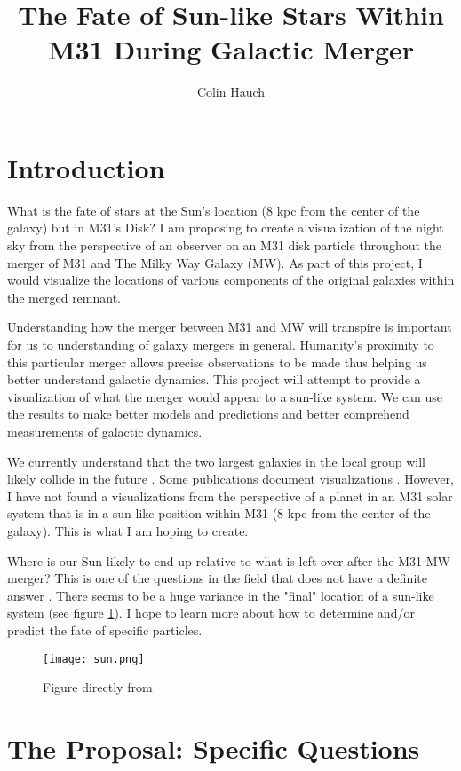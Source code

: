 \documentclass[twocolumn]{aastex63}
\begin{document}
\title{The Fate of Sun-like Stars Within M31 During Galactic Merger}
\author{Colin Hauch}


\section{Introduction} \label{sec:intro}
What is the fate of stars at the Sun's location (8 kpc from the center of the galaxy) but in M31's Disk? I am proposing to create a visualization of the night sky from the perspective of an observer on an M31 disk particle throughout the merger of M31 and The Milky Way Galaxy (MW). As part of this project, I would visualize the locations of various components of the original galaxies within the merged remnant.

Understanding how the merger between M31 and MW will transpire is important for us to understanding of galaxy mergers in general. Humanity's proximity to this particular merger allows precise observations to be made thus helping us better understand galactic dynamics. This project will attempt to provide a visualization of what the merger would appear to a sun-like system. We can use the results to make better models and predictions and better comprehend measurements of galactic dynamics. 

We currently understand that the two largest galaxies in the local group will likely collide in the future \citep[e.g.][and many others]{vdm12,vdm19}. Some publications document visualizations \citep{cox08}. However, I have not found a visualizations from the perspective of a planet in an M31 solar system that is in a sun-like position within M31 (8 kpc from the center of the galaxy). This is what I am hoping to create.

Where is our Sun likely to end up relative to what is left over after the M31-MW merger? This is one of the questions in the field that does not have a definite answer \citep{cox08}. There seems to be a huge variance in the "final" location of a sun-like system (see figure \ref{fig:sun}). I hope to learn more about how to determine and/or predict the fate of specific particles. 

\begin{figure}[htp]
    \centering
    \texttt{[image: sun.png]}
    \caption{Figure directly from \cite{cox08}}
    \label{fig:sun}
\end{figure}

\section{The Proposal: Specific Questions} \label{sec:style}
\end{document}
